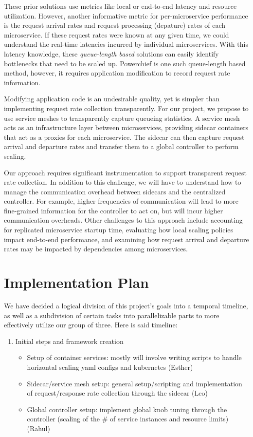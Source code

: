 \documentclass{proposal}
\begin{document}
These prior solutions use metrics like local or end-to-end latency and resource utilization. However, another informative metric for per-microservice performance is the request arrival rates and request processing (depature) rates of each microservice. If these request rates were known at any given time, we could understand the real-time latencies incurred by individual microservices. With this latency knowledge, these \textit{queue-length based} solutions can easily identify bottlenecks that need to be scaled up. Powerchief is one such queue-length based method, however, it requires application modification to record request rate information.

Modifying application code is an undesirable quality, yet is simpler than implementing request rate collection transparently. For our project, we propose to use service meshes to transparently capture queueing statistics. A service mesh acts as an infrastructure layer between microservices, providing sidecar containers that act as a proxies for each microservice. The sidecar can then capture request arrival and departure rates and transfer them to a global controller to perform scaling.

Our approach requires significant instrumentation to support transparent request rate collection. In addition to this challenge, we will have to understand how to manage the communication overhead between sidecars and the centralized controller. For example, higher frequencies of communication will lead to more fine-grained information for the controller to act on, but will incur higher communication overheads.
Other challenges to this approach include accounting for replicated microservice startup time, evaluating how local scaling policies impact end-to-end performance, and examining how request arrival and departure rates may be impacted by dependencies among microservices.

\section{Implementation Plan}
We have decided a logical division of this project's goals into a temporal timeline, as well as a subdivision of certain tasks into parallelizable parts to more effectively utilize our group of three. Here is said timeline:
\begin{enumerate}
    \item Initial steps and framework creation
    \begin{itemize}
        \item Setup of container services: mostly will involve writing scripts to handle horizontal scaling yaml configs and kubernetes (Esther)
        \item Sidecar/service mesh setup: general setup/scripting and implementation of request/response rate collection through the sidecar (Leo)
        \item Global controller setup: implement global knob tuning through the controller (scaling of the \# of service instances and resource limits) (Rahul)
    \end{itemize}
\end{enumerate}
\end{document}
